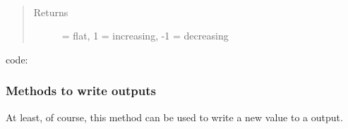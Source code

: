 \documentclass[letterpaper,10pt,english]{sphinxmanual}
\begin{document}

\begin{fulllineitems}
\label{\detokenize{io:valTrend}}~\begin{quote}\begin{description}
\item[{Returns}]  = flat, 1 = increasing, -1 = decreasing

\end{description}\end{quote}

code:

%
\begin{sphinxVerbatim}[commandchars=\\\{\}]
                   
  \PYG{p}{[}\PYG{p}{]}  \PYG{p}{[}\PYG{p}{]}  
   
     
   
     
 
\end{sphinxVerbatim}

\end{fulllineitems}



\subsubsection{Methods to write outputs}
\label{\detokenize{io:methods-to-write-outputs}}
At least, of course, this method can be used to write a new value to a output.
\end{document}
